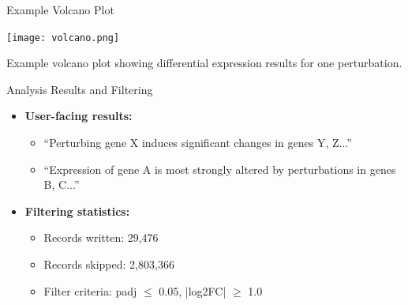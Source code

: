 \documentclass[handout]{beamer}
\begin{document}
\begin{frame}{Example Volcano Plot}
    \begin{center}
        \texttt{[image: volcano.png]}
        
        \vspace{1em}
        Example volcano plot showing differential expression results for one perturbation.
    \end{center}
\end{frame}

\begin{frame}{Analysis Results and Filtering}
    \begin{itemize}
        \item \textbf{User-facing results:}
        \begin{itemize}
            \item ``Perturbing gene X induces significant changes in genes Y, Z...''
            \item ``Expression of gene A is most strongly altered by perturbations in genes B, C...''
        \end{itemize}
        \item \textbf{Filtering statistics:}
        \begin{itemize}
            \item Records written: 29,476
            \item Records skipped: 2,803,366
            \item Filter criteria: padj $\leq$ 0.05, |log2FC| $\geq$ 1.0
        \end{itemize}
    \end{itemize}
\end{frame}
\end{document}
